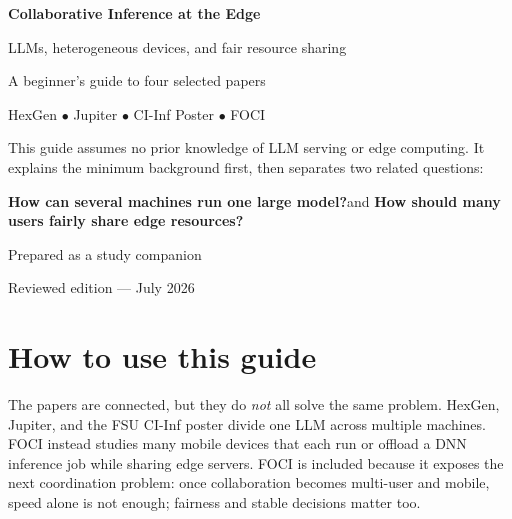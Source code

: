 \documentclass[10pt,a4paper]{article}
\begin{document}
\begin{titlepage}
\thispagestyle{empty}
\centering
\vspace*{2.1cm}
{\fontsize{29}{35}\selectfont\bfseries\color{navy}Collaborative Inference at the Edge\par}
\vspace{0.45cm}
{\Large\color{navy}LLMs, heterogeneous devices, and fair resource sharing\par}
\vspace{1.0cm}
{\large A beginner's guide to four selected papers\par}
\vspace{0.45cm}
{\large HexGen \quad $\bullet$ \quad Jupiter \quad $\bullet$ \quad CI-Inf Poster \quad $\bullet$ \quad FOCI\par}

\vspace{1.3cm}
\begin{tcolorbox}[width=0.82\textwidth,colback=graybox,colframe=navy,boxrule=0.9pt,arc=3pt]
\centering
This guide assumes no prior knowledge of LLM serving or edge computing. It explains the minimum background first, then separates two related questions:

\vspace{0.25em}
\textbf{How can several machines run one large model?}\quad and\quad
\textbf{How should many users fairly share edge resources?}
\end{tcolorbox}

\vfill
{\large Prepared as a study companion\par}
\vspace{0.25cm}
{\large Reviewed edition --- July 2026\par}
\end{titlepage}

\tableofcontents

\section*{How to use this guide}

The papers are connected, but they do \emph{not} all solve the same problem. HexGen, Jupiter, and the FSU CI-Inf poster divide one LLM across multiple machines. FOCI instead studies many mobile devices that each run or offload a DNN inference job while sharing edge servers. FOCI is included because it exposes the next coordination problem: once collaboration becomes multi-user and mobile, speed alone is not enough; fairness and stable decisions matter too.
\end{document}
